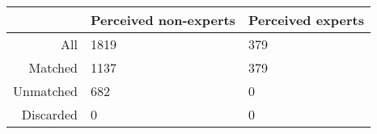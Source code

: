 \begin{table}[ht]
\centering
\begin{tabular}{rll}
  \hline
 & Perceived non-experts & Perceived experts \\ 
  \hline
All & 1819 & 379 \\ 
  Matched & 1137 & 379 \\ 
  Unmatched & 682 & 0 \\ 
  Discarded & 0 & 0 \\ 
   \hline
\end{tabular}
\end{table}
